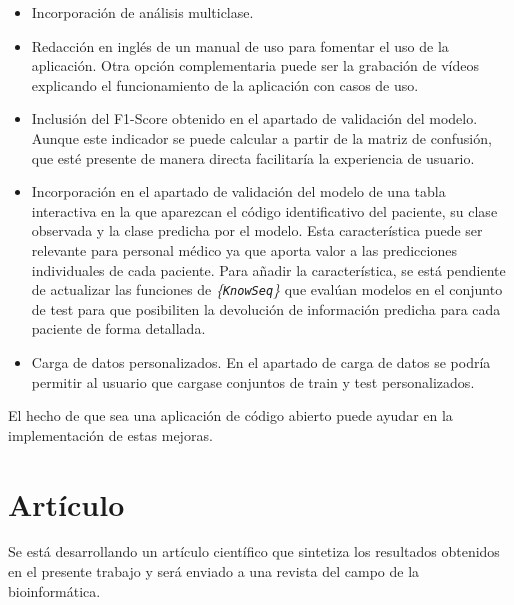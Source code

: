 \begin{itemize}
	\item Incorporación de análisis multiclase. 
	\item Redacción en inglés de un manual de uso para fomentar el uso de la aplicación. Otra opción complementaria puede ser la grabación de vídeos explicando el funcionamiento de la aplicación con casos de uso.
	\item Inclusión del F1-Score obtenido en el apartado de validación del modelo. Aunque este indicador se puede calcular a partir de la matriz de confusión, que esté presente de manera directa facilitaría la experiencia de usuario.
	\item  Incorporación en el apartado de validación del modelo de una tabla interactiva en la que aparezcan el código identificativo del paciente, su clase observada y la clase predicha por el modelo. Esta característica puede ser relevante para personal médico ya que aporta valor a las predicciones individuales de cada paciente. Para añadir la característica, se está pendiente de actualizar las funciones de \textit{\{\texttt{KnowSeq}\}} que evalúan modelos en el conjunto de test para que posibiliten la devolución de información predicha para cada paciente de forma detallada.
	\item Carga de datos personalizados. En el apartado de carga de datos se podría permitir al usuario que cargase conjuntos de train y test personalizados.
\end{itemize}

El hecho de que sea una aplicación de código abierto puede ayudar en la implementación de estas mejoras.

\section{Artículo}

Se está desarrollando un artículo científico que sintetiza los resultados obtenidos en el presente trabajo y será enviado a una revista del campo de la bioinformática.